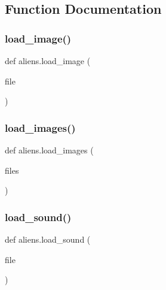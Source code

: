 \subsection{Function Documentation}
\mbox{\label{namespacealiens_afd3fe81cae5b9e9518034c5a41b31e49}} 
\subsubsection{\texorpdfstring{load\+\_\+image()}{load\_image()}}
{\footnotesize\ttfamily def aliens.\+load\+\_\+image (\begin{DoxyParamCaption}\item[{}]{file }\end{DoxyParamCaption})}

\mbox{\label{namespacealiens_aa5cbe942057d524e9d5c469c5e121b69}} 
\subsubsection{\texorpdfstring{load\+\_\+images()}{load\_images()}}
{\footnotesize\ttfamily def aliens.\+load\+\_\+images (\begin{DoxyParamCaption}\item[{}]{files }\end{DoxyParamCaption})}

\mbox{\label{namespacealiens_ab0f50ede8108ffa183811f5137a277a5}} 
\subsubsection{\texorpdfstring{load\+\_\+sound()}{load\_sound()}}
{\footnotesize\ttfamily def aliens.\+load\+\_\+sound (\begin{DoxyParamCaption}\item[{}]{file }\end{DoxyParamCaption})}

\mbox{\label{namespacealiens_a9fa9246c75151e1ea7a030cda205948c}} 
